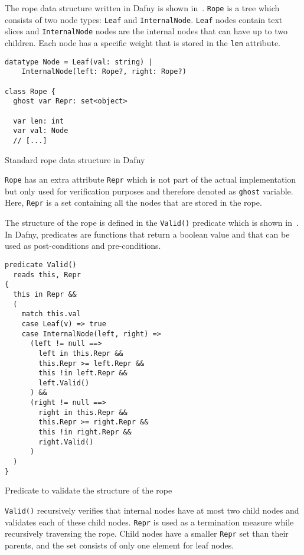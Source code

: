 The rope data structure written in Dafny is shown in~.
\texttt{Rope} is a tree which consists of two node types: \texttt{Leaf} and \texttt{InternalNode}.
\texttt{Leaf} nodes contain text slices and \texttt{InternalNode} nodes are the internal nodes that can have up to two children.
Each node has a specific weight that is stored in the \texttt{len} attribute.


\begin{listing}[h!]
\begin{verbatim}
datatype Node = Leaf(val: string) | 
    InternalNode(left: Rope?, right: Rope?)

class Rope {
  ghost var Repr: set<object>

  var len: int
  var val: Node
  // [...]
\end{verbatim}
    \caption{Standard rope data structure in Dafny}
    \label{lst:rope}
\end{listing}

\texttt{Rope} has an extra attribute \texttt{Repr} which is not part of the actual implementation but only used for verification purposes and therefore denoted as \texttt{ghost} variable.
Here, \texttt{Repr} is a set containing all the nodes that are stored in the rope.

The structure of the rope is defined in the \texttt{Valid()} predicate which is shown in~.
In Dafny, predicates are functions that return a boolean value and that can be used as post-conditions and pre-conditions.

\begin{listing}[h!]
\begin{verbatim}
predicate Valid()
  reads this, Repr
{
  this in Repr &&
  (
    match this.val
    case Leaf(v) => true
    case InternalNode(left, right) =>
      (left != null ==>
        left in this.Repr && 
        this.Repr >= left.Repr && 
        this !in left.Repr && 
        left.Valid()
      ) &&
      (right != null ==>
        right in this.Repr && 
        this.Repr >= right.Repr &&
        this !in right.Repr &&
        right.Valid()
      )
  )
}
\end{verbatim}
    \caption{Predicate to validate the structure of the rope}
    \label{lst:rope-valid}
\end{listing}

\texttt{Valid()} recursively verifies that internal nodes have at most two child nodes and validates each of these child nodes.
\texttt{Repr} is used as a termination measure while recursively traversing the rope.
Child nodes have a smaller \texttt{Repr} set than their parents, and the set consists of only one element for leaf nodes.

